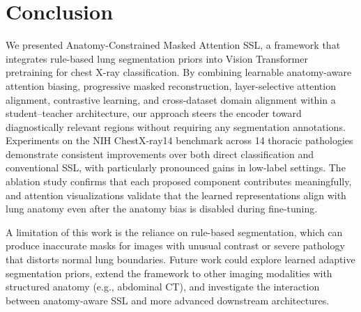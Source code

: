 \section{Conclusion}
\label{sec:conclusion}

We presented Anatomy-Constrained Masked Attention SSL, a framework that integrates rule-based lung segmentation priors into Vision Transformer pretraining for chest X-ray classification. By combining learnable anatomy-aware attention biasing, progressive masked reconstruction, layer-selective attention alignment, contrastive learning, and cross-dataset domain alignment within a student--teacher architecture, our approach steers the encoder toward diagnostically relevant regions without requiring any segmentation annotations. Experiments on the NIH ChestX-ray14 benchmark across 14 thoracic pathologies demonstrate consistent improvements over both direct classification and conventional SSL, with particularly pronounced gains in low-label settings. The ablation study confirms that each proposed component contributes meaningfully, and attention visualizations validate that the learned representations align with lung anatomy even after the anatomy bias is disabled during fine-tuning.

A limitation of this work is the reliance on rule-based segmentation, which can produce inaccurate masks for images with unusual contrast or severe pathology that distorts normal lung boundaries. Future work could explore learned adaptive segmentation priors, extend the framework to other imaging modalities with structured anatomy (e.g., abdominal CT), and investigate the interaction between anatomy-aware SSL and more advanced downstream architectures.
